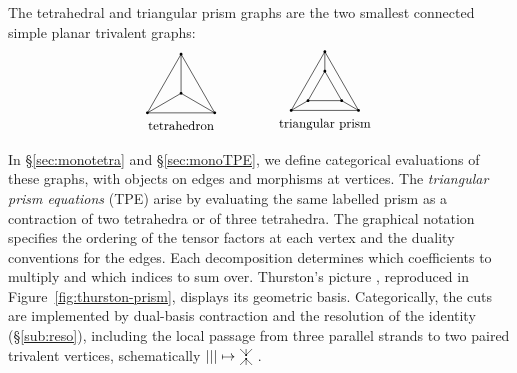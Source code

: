 \documentclass{amsart}
\begin{document}
The tetrahedral and triangular prism graphs are the two smallest connected simple planar trivalent graphs:
\[
\begin{tikzpicture}[scale=.85,line width=.45pt]
\draw (0,0)--(2,0)--(1,1.732)--cycle;
\draw (0,0)--(1,.577)--(2,0) (1,.577)--(1,1.732);
\foreach \p in {(0,0),(2,0),(1,1.732),(1,.577)}\fill \p circle[radius=1.2pt];
\node[below] at (1,-.1) {\small tetrahedron};
\end{tikzpicture}
\qquad\qquad
\begin{tikzpicture}[scale=.85,line width=.45pt]
\draw (0,0)--(2,0)--(1,1.732)--cycle;
\draw (.5,.2885)--(1.5,.2885)--(1,1.1545)--cycle;
\draw (0,0)--(.5,.2885) (2,0)--(1.5,.2885) (1,1.732)--(1,1.1545);
\foreach \p in {(0,0),(2,0),(1,1.732),(.5,.2885),(1.5,.2885),(1,1.1545)}\fill \p circle[radius=1.2pt];
\node[below] at (1,-.1) {\small triangular prism};
\end{tikzpicture}
\]
In \S\ref{sec:monotetra} and \S\ref{sec:monoTPE}, we define categorical evaluations of these graphs, with objects on edges and morphisms at vertices. The \emph{triangular prism equations} (TPE) arise by evaluating the same labelled prism as a contraction of two tetrahedra or of three tetrahedra. The graphical notation specifies the ordering of the tensor factors at each vertex and the duality conventions for the edges. Each decomposition determines which coefficients to multiply and which indices to sum over. Thurston's picture \cite[Figure~4]{thu}, reproduced in Figure~\ref{fig:thurston-prism}, displays its geometric basis. Categorically, the cuts are implemented by dual-basis contraction and the resolution of the identity (\S\ref{sub:reso}), including the local passage from three parallel strands to two paired trivalent vertices, schematically $|||\mapsto\ThreeSymbol$.
\end{document}
